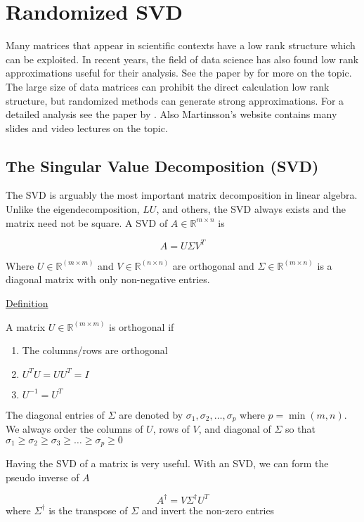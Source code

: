 \section{Randomized SVD}
Many matrices that appear in scientific contexts have a low rank structure which can 
be exploited. In recent years, the field of data science has also found low rank approximations
useful for their analysis. See the paper by \cite{udell-2019} for more on the topic.
The large size of data matrices can prohibit the direct calculation low rank structure, but
randomized methods can generate strong approximations. For a detailed analysis see the paper by
\cite{martinsson-2011} . Also Martinsson's website contains many slides and video lectures
on the topic. 
\subsection{The Singular Value Decomposition (SVD)}
The SVD is arguably the most important matrix decomposition in linear algebra.
Unlike the eigendecomposition, $LU$, and others, the SVD always exists and the
matrix need not be square. A SVD of $A\in\mathbb{R}^{m \times n}$ is

\begin{equation*}
A= U \Sigma V^{T}
\end{equation*}

Where $U\in \mathbb{R}^{(m \times m)}$ and $V \in \mathbb{R}^{(n \times n)}$ are
orthogonal and $\Sigma\in\mathbb{R}^{(m \times n)}$ is a diagonal matrix with
only non-negative entries.

\underline{Definition}

A matrix $U\in \mathbb{R}^{(m \times m)}$ is orthogonal if
\begin{enumerate}[1)]
\item The columns/rows are orthogonal
\item $U^{T}U = UU^{T} = I$
\item $U^{-1} = U^{T}$
\end{enumerate}

The diagonal entries of $\Sigma$ are denoted by $\sigma_1, \sigma_2, \ldots,
\sigma_p$ where $p=\min(m, n)$. We always order the columns of $U$, rows of
$V$, and diagonal of $\Sigma$ so that $\sigma_1 \geq \sigma_2 \geq \sigma_3 \geq
\ldots \geq \sigma_p \geq 0$

Having the SVD of a matrix is very useful. With an SVD, we can form the pseudo
inverse of $A$

\begin{equation*}
A^\dagger  = V \Sigma^\dagger U^T
\end{equation*}
where $\Sigma^\dagger$ is the transpose of $\Sigma$ and invert the non-zero
entries


